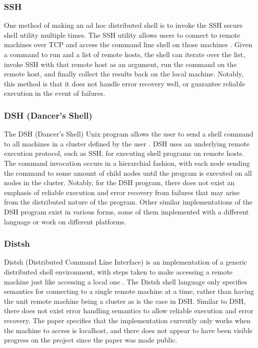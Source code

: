 \documentclass[twoside]{report}
\begin{document}
\subsubsection{SSH}
One method of making an ad hoc distributed shell is to invoke the SSH secure shell utility multiple times.
The SSH utility allows users to connect to remote machines over TCP and access the command line shell on those machines \cite{rfc4251}.
Given a command to run and a list of remote hosts, the shell can iterate over the list, invoke SSH with that remote host as an argument, run the command on the remote host, and finally collect the results back on the local machine.
Notably, this method is that it does not handle error recovery well, or guarantee reliable execution in the event of failures.

\subsubsection{DSH (Dancer's Shell)}
The DSH (Dancer's Shell) Unix program allows the user to send a shell command to all machines in a cluster defined by the user \cite{dshdancer}.
DSH uses an underlying remote execution protocol, such as SSH, for executing shell programs on remote hosts.
The command invocation occurs in a hierarchial fashion, with each node sending the command to some amount of child nodes until the program is executed on all nodes in the cluster.
Notably, for the DSH program, there does not exist an emphasis of reliable execution and error recovery from failures that may arise from the distributed nature of the program.
Other similar implementations of the DSH program exist in various forms, some of them implemented with a different language or work on different platforms.

\subsubsection{Distsh}
Distsh (Distributed Command Line Interface) is an implementation of a generic distributed shell environment, with steps taken to make accessing a remote machine just like accessing a local one \cite{distsh}.
The Distsh shell language only specifies semantics for connecting to a single remote machine at a time, rather than having the unit remote machine being a cluster as is the case in DSH.
Similar to DSH, there does not exist error handling semantics to allow reliable execution and error recovery.
The paper specifies that the implementation currently only works when the machine to access is localhost, and there does not appear to have been visible progress on the project since the paper was made public.
\end{document}
